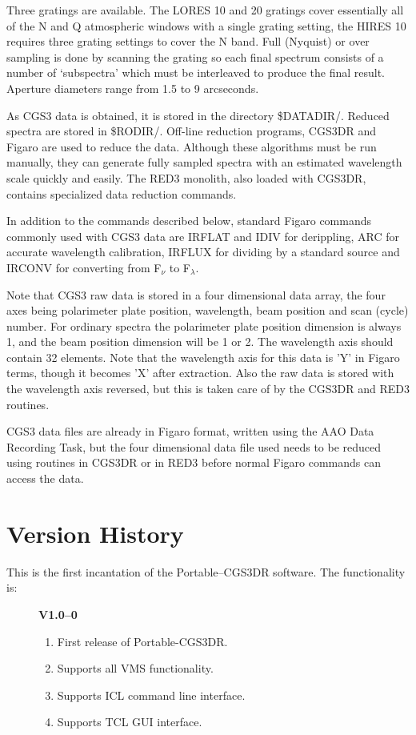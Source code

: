 \documentclass[a4paper]{book}
\renewcommand{\_}{{\tt\char'137}}
\begin{document}
Three gratings are available. The LORES 10 and 20 gratings cover
essentially all of the N and Q atmospheric windows with a single grating
setting, the HIRES 10 requires three grating settings to cover the N band.
Full (Nyquist) or over sampling is done by scanning the grating so each
final spectrum consists of a number of `subspectra'  which must be
interleaved to produce the final result. Aperture diameters range from 
1.5 to 9 arcseconds. 

As CGS3 data is obtained, it is stored in the directory \$DATADIR/.
Reduced spectra are stored in \$RODIR/. Off-line reduction programs, CGS3DR 
and Figaro are used to reduce the data. Although these algorithms must be run 
manually, they can generate fully sampled spectra with an estimated wavelength
scale quickly and easily. The RED3 monolith, also loaded with CGS3DR, contains 
specialized data reduction commands. 

In addition to the commands described below, standard Figaro commands
commonly used with CGS3 data are IRFLAT and IDIV for derippling, ARC for
accurate wavelength calibration, IRFLUX for dividing by a standard source and
IRCONV for converting from F$_{\nu}$ to F$_{\lambda}$. 

Note that CGS3 raw data is stored in a four dimensional data array, the
four axes being polarimeter plate position, wavelength, beam position and
scan (cycle) number. For ordinary spectra the polarimeter plate position
dimension is always 1, and the beam position dimension will be 1 or 2. The
wavelength axis should contain 32 elements. Note that the wavelength axis
for this data is 'Y' in Figaro terms, though it becomes 'X' after
extraction. Also the raw data is stored with the wavelength axis reversed,
but this is taken care of by the CGS3DR and RED3 routines. 

CGS3 data files are already in Figaro format, written using the AAO Data
Recording Task, but the four dimensional data file used needs to be reduced
using routines in CGS3DR or in RED3 before normal Figaro commands can
access the data. 

\section{Version History}
This is the first incantation of the Portable--CGS3DR software. The
functionality is:

\begin{description}
\item[] {\bf V1.0--0}
 \begin{enumerate}
  \item First release of Portable-CGS3DR.
  \item Supports all VMS functionality.
  \item Supports ICL command line interface.
  \item Supports TCL GUI interface.
 \end{enumerate}
\end{description}
\end{document}
